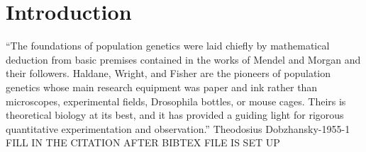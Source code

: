 \chapter{Introduction}
\label{chap:introduction}

\begin{quoteshrink}
  ``The foundations of population genetics were laid chiefly by mathematical deduction from basic premises contained in the works of Mendel and Morgan and their followers. Haldane, Wright, and Fisher are the pioneers of population genetics whose main research equipment was paper and ink rather than microscopes, experimental fields, Drosophila bottles, or mouse cages. Theirs is theoretical biology at its best, and it has provided a guiding light for rigorous quantitative experimentation and observation.''
  \hfill\citet{}Theodosius Dobzhansky-1955-1 FILL IN THE CITATION AFTER BIBTEX FILE IS SET UP
\end{quoteshrink}

\noindent


